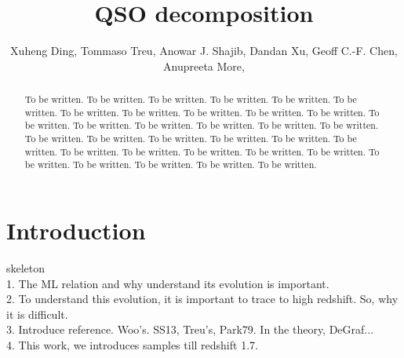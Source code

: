 \documentclass[apj]{emulateapj}
\begin{document}
\def\lcdm{$\Lambda$CDM}
\def\hst{{\it HST}}
\def\efr{$R_{\mathrm{eff}}$}
\def\galfit{\sc Galfit}
\def\mbh{$\mathcal M_{\rm BH}$}
\def\lhost{$L_{\rm host}$}
\def\jcap{Journal of Cosmology and Astroparticle Physics}
\def\halpha{${\it H}\alpha$}
\def\hbeta{${\it H}\beta$}

\title{QSO decomposition}

\author{Xuheng Ding, Tommaso Treu, Anowar J. Shajib, Dandan Xu, Geoff C.-F. Chen,  Anupreeta More,
}


\begin{abstract}
To be written. To be written. To be written. To be written. To be written. To be written. To be written. To be written. To be written. To be written. To be written. To be written. To be written. To be written. To be written. To be written. To be written. To be written. To be written. To be written. To be written. To be written. To be written. To be written. To be written. To be written. To be written. To be written. To be written. To be written. To be written. To be written. To be written. 
\end{abstract}


\section{Introduction}
\label{sec:introduction}
skeleton
\\
1. The ML relation and why understand its evolution is important.\\
2. To understand this evolution, it is important to trace to high redshift. So, why it is difficult.\\
3. Introduce reference. Woo's. SS13, Treu's, Park79. In the theory, DeGraf...\\
4. This work, we introduces samples till redshift 1.7.
\end{document}
